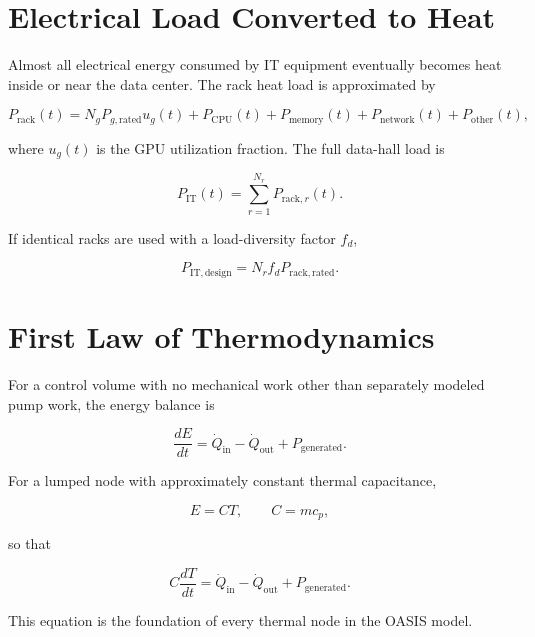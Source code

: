 \documentclass[11pt]{article}
\begin{document}
\section{Electrical Load Converted to Heat}

Almost all electrical energy consumed by IT equipment eventually becomes heat inside
or near the data center. The rack heat load is approximated by

\begin{equation}
P_{\mathrm{rack}}(t)
= N_g P_{g,\mathrm{rated}}u_g(t)
+ P_{\mathrm{CPU}}(t)
+ P_{\mathrm{memory}}(t)
+ P_{\mathrm{network}}(t)
+ P_{\mathrm{other}}(t),
\end{equation}

where \(u_g(t)\) is the GPU utilization fraction. The full data-hall load is

\begin{equation}
P_{\mathrm{IT}}(t)=\sum_{r=1}^{N_r}P_{\mathrm{rack},r}(t).
\end{equation}

If identical racks are used with a load-diversity factor \(f_d\),

\begin{equation}
P_{\mathrm{IT,design}}=N_r f_d P_{\mathrm{rack,rated}}.
\end{equation}

\section{First Law of Thermodynamics}

For a control volume with no mechanical work other than separately modeled pump work,
the energy balance is

\begin{equation}
\frac{dE}{dt}=\dot Q_{\mathrm{in}}-\dot Q_{\mathrm{out}}+P_{\mathrm{generated}}.
\end{equation}

For a lumped node with approximately constant thermal capacitance,

\begin{equation}
E=CT,
\qquad
C=mc_p,
\end{equation}

so that

\begin{equation}
C\frac{dT}{dt}=\dot Q_{\mathrm{in}}-\dot Q_{\mathrm{out}}+P_{\mathrm{generated}}.
\end{equation}

This equation is the foundation of every thermal node in the OASIS model.
\end{document}

